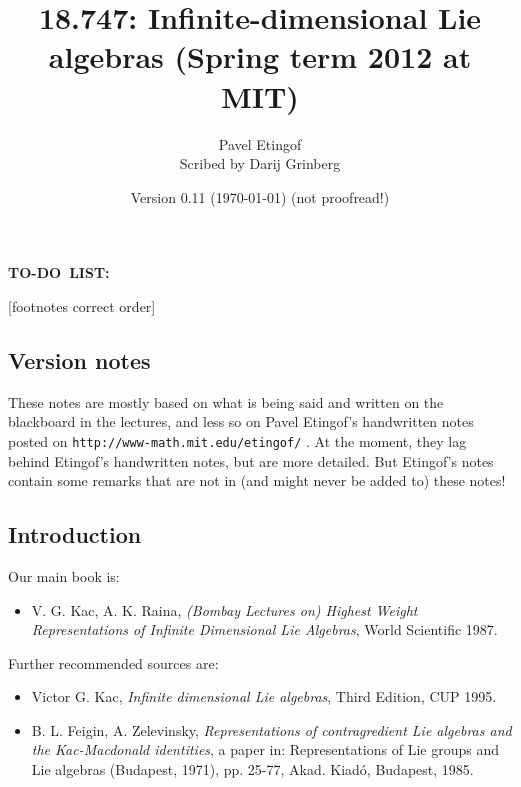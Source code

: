 \documentclass
[numbers=enddot,12pt,final,onecolumn,german,notitlepage]{scrartcl}%
\theoremstyle{definition}
\newenvironment{noncompile}{}{}
\begin{document}
\title{18.747: Infinite-dimensional Lie algebras (Spring term 2012 at MIT)}
\author{Pavel Etingof\\Scribed by Darij Grinberg}
\date{Version 0.11 (\today) (not proofread!)}
\maketitle
\tableofcontents

\begin{noncompile}
\textbf{TO-DO\ LIST:}

[footnotes correct order]
\end{noncompile}

\subsection{Version notes}

These notes are mostly based on what is being said and written on the
blackboard in the lectures, and less so on Pavel Etingof's handwritten notes
posted on \newline\texttt{http://www-math.mit.edu/etingof/} . At
the moment, they lag behind Etingof's handwritten notes, but are more
detailed. But Etingof's notes contain some remarks that are not in (and might
never be added to) these notes!

\subsection{Introduction}

Our main book is:

\begin{itemize}
\item V. G. Kac, A. K. Raina, \textit{(Bombay Lectures on) Highest Weight
Representations of Infinite Dimensional Lie Algebras}, World Scientific 1987.
\end{itemize}

Further recommended sources are:

\begin{itemize}
\item Victor G. Kac, \textit{Infinite dimensional Lie algebras}, Third
Edition, CUP 1995.

\item B. L. Feigin, A. Zelevinsky, \textit{Representations of contragredient
Lie algebras and the Kac-Macdonald identities}, a paper in: Representations of
Lie groups and Lie algebras (Budapest, 1971), pp. 25-77, Akad. Kiad\'{o},
Budapest, 1985.
\end{itemize}
\end{document}
